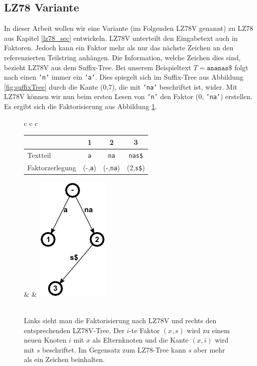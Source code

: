 \documentclass[a4paper,11pt]{scrartcl}%
\theoremstyle{change}
\theoremstyle{nonumberplain}
\theoremstyle{change}
\theoremstyle{nonumberplain}
\theoremstyle{change}
\theoremstyle{nonumberplain}
\begin{document}
	
	

\subsection{LZ78 Variante}\label{LZ78 Variante}

In dieser Arbeit wollen wir eine Variante (im Folgenden LZ78V genannt) zu LZ78 aus Kapitel \ref{lz78_sec} entwickeln. LZ78V unterteilt den Eingabetext auch in Faktoren. Jedoch kann ein Faktor mehr als nur das nächste Zeichen an den referenzierten Teilstring anhängen. Die Information, welche Zeichen dies sind, bezieht LZ78V aus dem Suffix-Tree. Bei unserem Beispieltext $T = \texttt{ananas\$}$ folgt nach einen \texttt{'n'} immer ein \texttt{'a'}. Dies spiegelt sich im Suffix-Tree aus Abbildung \ref{fig:suffixTree} durch die Kante (0,7), die mit \texttt{'na'} beschriftet ist, wider. Mit LZ78V können wir nun beim ersten Lesen von \texttt{'n'} den Faktor (0, \texttt{'na'}) erstellen.
 Es ergibt sich die Faktorisierung aus Abbildung \ref{fig:lz78v}. \\\newpage
	\begin{figure}[h]
	\begin{tabular}[t]{c c c}
		\begin{tabular}[b]{l c c c}\hline
			& 1 & 2 & 3  \\ \hline
  		Textteil & \texttt{a} & \texttt{na} & \texttt{nas\$} \\ \hline
  		Faktorzerlegung & (-,\texttt{a}) & (-,\texttt{na}) & (2,\texttt{s\$}) \\ \hline
		\end{tabular} & \hspace{2cm} & \includegraphics{./pics/ananas_LZ78VTree}\\\\
	\end{tabular}
	\caption{Links sieht man die Faktorisierung nach LZ78V und rechts den entsprechenden LZ78V-Tree. Der $i$-te Faktor $(x,s)$ wird zu einem neuen Knoten $i$ mit $x$ als Elternknoten und die Kante $(x,i)$ wird mit $s$ beschriftet. Im Gegensatz zum LZ78-Tree kann $s$ aber mehr als ein Zeichen beinhalten.}
	\label{fig:lz78v}
	\end{figure}
	
\end{document}
